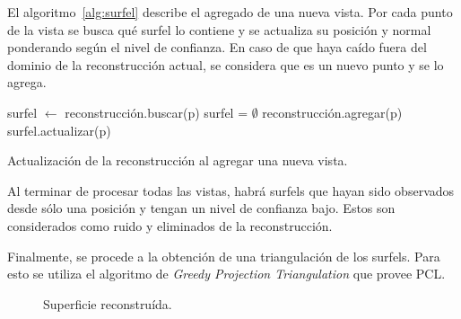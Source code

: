 	El algoritmo~\ref{alg:surfel} describe el agregado de una nueva vista.
	Por cada punto de la vista se busca qué surfel lo contiene y se actualiza
	su posición y normal ponderando según el nivel de confianza.
	En caso de que haya caído fuera del dominio de la reconstrucción actual, se
	considera que es un nuevo punto y se lo agrega. 

	\begin{algorithm}
		\begin{algorithmic}[1]
					\State surfel $\gets$ reconstrucción.buscar(p)
					\If surfel = $\emptyset$
						\State reconstrucción.agregar(p)
					\Else
						\State surfel.actualizar(p)
					\EndIf
				\EndFor
			\EndFunction
		\end{algorithmic}
		\caption{\label{alg:surfel}Actualización de la reconstrucción al agregar una nueva vista.}
	\end{algorithm}

	Al terminar de procesar todas las vistas, habrá surfels que hayan sido
	observados desde sólo una posición y tengan un nivel de confianza bajo.
	Estos son considerados como ruido y eliminados de la
	reconstrucción.

	Finalmente, se procede a la obtención de una triangulación de los surfels.
	Para esto se utiliza el algoritmo de \emph{Greedy Projection Triangulation} que provee PCL.

	\begin{figure}
		\caption{\label{fig:surface}Superficie reconstruída.}
	\end{figure}
